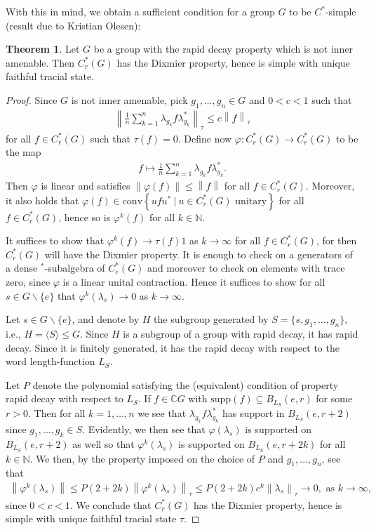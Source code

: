 \documentclass[10pt,oneside,openany,final]{memoir}
\theoremstyle{definition}
\newtheorem{theorem}{Theorem}
\theoremstyle{Break}
\newcommand{\lv}{\left\lVert}
\newcommand{\rv}{\right\rVert}
\newcommand{\C}{\mathbb{C}}
\newcommand{\N}{\mathbb{N}}
\begin{document}
With this in mind, we obtain a sufficient condition for a group $G$ to be $C^*$-simple (result due to Kristian Olesen):
\begin{theorem}
	Let $G$ be a group with the rapid decay property which is not inner amenable. Then $C_r^*(G)$ has the Dixmier property, hence is simple with unique faithful tracial state.
\end{theorem}
\begin{proof}
Since $G$ is not inner amenable, pick $g_1,\dots,g_n \in G$ and $0 < c < 1$ such that 
\begin{align*}
	\lv \frac{1}{n} \sum_{k=1}^{n} \lambda_{g_k} f \lambda_{g_k}^* \rv_\tau \leq c \lv f \rv_\tau
\end{align*}
for all $f \in C_r^*(G)$ such that $\tau(f)=0$. Define now $\varphi \colon C_r^*(G) \to C_r^*(G)$ to be the map 
\begin{align*}
	f \mapsto \frac{1}{n} \sum_{k=1}^{n } \lambda_{g_k} f \lambda_{g_k}^*.
\end{align*}
Then $\varphi$ is linear and satisfies $\lv\varphi(f)\rv \leq \lv f \rv$ for all $f \in C_r^*(G)$. Moreover, it also holds that $\varphi(f) \in \mathrm{conv}\left\{ ufu^* \ | \ u \in C_r^*(G) \text{ unitary}  \right\}$ for all $f \in C_r^*(G)$, hence so is $\varphi^k(f)$ for all $k \in \N$. 

It suffices to show that $\varphi^k(f) \to \tau(f)1$ as $k \to \infty$ for all $f \in C_r^*(G)$, for then $C_r^*(G)$ will have the Dixmier property. It is enough to check on a generators of a dense $^*$-subalgebra of $C_r^*(G)$ and moreover to check on elements with trace zero, since $\varphi$ is a linear unital contraction. Hence it suffices to show for all $ s \in G \backslash \{e\}$ that $\varphi^k(\lambda_s) \to 0$ as $k \to \infty$.

Let $ s \in G \backslash\{e\}$, and denote by $H$ the subgroup generated by $S=\{s,g_1,\dots,g_n\}$, i.e., $H=\langle S \rangle \leq G$. Since $H$ is a subgroup of a group with rapid decay, it has rapid decay. Since it is finitely generated, it has the rapid decay with respect to the word length-function $L_S$.

Let $P$ denote the polynomial satisfying the (equivalent) condition of property rapid decay with respect to $L_S$. If $f \in \C G$ with $\mathrm{supp}(f) \subseteq B_{L_S}(e,r)$ for some $r > 0$. Then for all $k=1,\dots,n$ we see that $\lambda_{g_k} f \lambda_{g_k}^{*}$ has support in $B_{L_S}(e,r+2)$ since $g_1,\dots,g_k \in S$. Evidently, we then see that $\varphi(\lambda_s)$ is supported on $B_{L_S}(e,r+2)$ as well so that $\varphi^k(\lambda_s)$ is supported on $B_{L_S}(e,r+2k)$ for all $k \in \N$. We then, by the property imposed on the choice of $P$ and $g_1,\dots,g_n$, see that
\begin{align*}
	\lv \varphi^k(\lambda_s)\rv \leq P(2+2k) \lv \varphi^k(\lambda_s)\rv_\tau \leq P(2+2k)c^k \lv \lambda_{s}\rv_\tau \to 0, \text{ as } k \to \infty,
\end{align*}
since $0 < c < 1$. We conclude that $C_r^*(G)$ has the Dixmier property, hence is simple with unique faithful tracial state $\tau$.
\end{proof}
\end{document}
